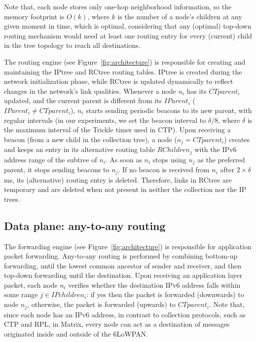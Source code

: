 Note that, each node stores only one-hop neighborhood information, so the memory footprint is $O(k)$, where $k$ is the number of a node's children at any given moment in time, which is optimal, considering that any (optimal) top-down routing mechanism would need at least one routing entry for every (current) child in the tree topology to reach all destinations.

The routing engine (see Figure~\ref{fig:architecture}) is responsible for creating and maintaining the IPtree and RCtree routing tables. IPtree is created during the network initialization phase, while RCtree is updated dynamically to reflect changes in the network's link qualities. Whenever a node $n_i$ has its $CTparent_i$ updated, and the current parent is different from its $IParent_i$ ($IParent_i \neq CTparent_i$), $n_i$ starts sending periodic beacons to its new parent, with regular intervals (in our experiments, we set the beacon interval to $\delta/8$, where $\delta$ is the maximum interval of the Trickle timer used in CTP). Upon receiving a beacon (from a new child in the collection tree), a node ($n_j = CTparent_i$) creates and keeps an entry in its alternative routing table $RChildren_j$ with the IPv6 address range of the subtree of $n_i$. As soon as $n_i$ stops using $n_j$ as the preferred parent, it stops sending beacons to $n_j$. If no beacon is received from $n_i$ after $2\times\delta$ ms, its (alternative) routing entry is deleted. Therefore, links in RCtree are temporary and are deleted when not present in neither the collection nor the IP trees.

\subsection{Data plane: any-to-any routing}

The forwarding engine (see Figure~\ref{fig:architecture}) is responsible for application packet forwarding. Any-to-any routing is performed by combining bottom-up forwarding, until the lowest common ancestor of sender and receiver, and then top-down forwarding until the destination. Upon receiving an application layer packet, each node $n_i$ verifies whether the destination IPv6 address falls within some range $j \in IPchildren_i$: if yes then the packet is forwarded (downwards) to node $n_j$, otherwise, the packet is forwarded (upwards) to $CTparent_i$. Note that, since each node has an IPv6 address, in contrast to collection protocols, such as CTP and RPL, in Matrix, every node can act as a destination of messages originated inside and outside of the 6LoWPAN.

